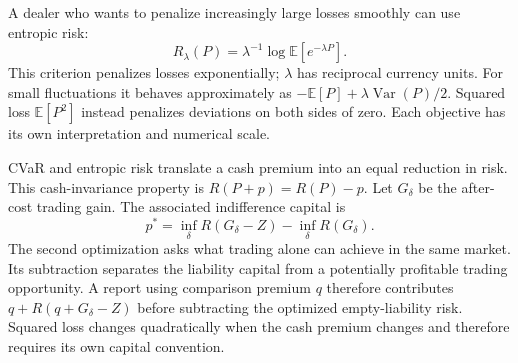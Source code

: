 \documentclass[8pt]{strategynet-journal}
\newcommand{\E}{\mathbb{E}}
\begin{document}
\begin{SNcolumns}
\begin{center}
\begin{minipage}{\linewidth}
\centering
{}
\captionsetup{font=normalsize}
\end{minipage}
\end{center}

A dealer who wants to penalize increasingly large losses smoothly can use
entropic risk:
\[
 R_\lambda(P)=\lambda^{-1}\log\E[e^{-\lambda P}].
\]
This criterion penalizes losses exponentially; $\lambda$ has reciprocal currency units.
For small fluctuations it behaves approximately as
$-\E[P]+\lambda\operatorname{Var}(P)/2$. Squared loss $\E[P^2]$ instead
penalizes deviations on both sides of zero. Each objective has its own
interpretation and numerical scale.

CVaR and entropic risk translate a cash premium into an equal reduction
in risk. This cash-invariance property is $R(P+p)=R(P)-p$. Let $G_\delta$
be the after-cost trading gain. The associated indifference capital is
\[
 p^*=\inf_\delta R(G_\delta-Z)
      -\inf_\delta R(G_\delta).
\]
The second optimization asks what trading alone can achieve in the same
market. Its subtraction separates the liability capital from a potentially
profitable trading opportunity. A report using comparison premium $q$
therefore contributes $q+R(q+G_\delta-Z)$ before subtracting the optimized
empty-liability risk. Squared loss changes quadratically when the cash premium
changes and therefore requires its own capital convention.


\end{SNcolumns}
\end{document}

